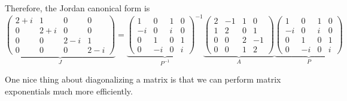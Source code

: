 \begin{example}
		Therefore, the Jordan canonical form is
		\begin{equation}
			\underbrace{\begin{pmatrix}
				2+i & 1 & 0 & 0 \\
				0 & 2+i & 0 & 0 \\
				0 & 0 & 2-i & 1 \\
				0 & 0 & 0 & 2-i
			\end{pmatrix}}_{J}
			=
			\underbrace{\begin{pmatrix}
				1 & 0 & 1 & 0 \\
				-i & 0 & i & 0 \\
				0 & 1 & 0 & 1 \\
				0 & -i & 0 & i
			\end{pmatrix}^{-1}}_{P^{-1}}
			\underbrace{\begin{pmatrix}
				2 & -1 & 1 & 0 \\
				1 & 2 & 0 & 1 \\
				0 & 0 & 2 & -1 \\
				0 & 0 & 1 & 2
			\end{pmatrix}}_{A}
			\underbrace{\begin{pmatrix}
				1 & 0 & 1 & 0 \\
				-i & 0 & i & 0 \\
				0 & 1 & 0 & 1 \\
				0 & -i & 0 & i
			\end{pmatrix}}_{P}
		\end{equation}
	\end{example}

	One nice thing about diagonalizing a matrix is that we can perform matrix exponentials much more efficiently. 

